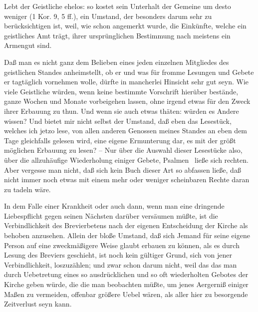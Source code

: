 \begin{aufza}
\begin{aufzb}
\item Lebt der Geistliche ehelos: so kostet sein Unterhalt der Gemeine um desto weniger (1 Kor. 9, 5 ff.), ein Umstand, der besonders darum sehr zu berücksichtigen ist, weil, wie schon angemerkt wurde, die Einkünfte, welche ein geistliches Amt trägt, ihrer ursprünglichen Bestimmung nach meistens ein Armengut sind.~
\end{aufzb}
\item Daß man es nicht ganz dem Belieben eines jeden einzelnen Mitgliedes des geistlichen Standes anheimstellt, ob er und was für fromme Lesungen und Gebete er tagtäglich vornehmen wolle, dürfte in mancherlei Hinsicht sehr gut seyn. Wie viele Geistliche würden, wenn keine bestimmte Vorschrift hierüber bestände, ganze Wochen und Monate vorbeigehen lassen, ohne irgend etwas für den Zweck ihrer Erbauung zu thun. Und wenn sie auch etwas thäten: würden es Andere wissen? Und bietet mir nicht selbst der Umstand, daß eben das Lesestück, welches ich jetzo lese, von allen anderen Genossen meines Standes an eben dem Tage gleichfalls gelesen wird, eine eigene Ermunterung dar, es mit der größt möglichen Erbauung zu lesen? -- Nur über die Auswahl dieser Lesestücke also, über die allzuhäufige Wiederholung einiger Gebete, Psalmen \udgl\  ließe sich rechten. Aber vergesse man nicht, daß sich kein Buch dieser Art so abfassen ließe, daß nicht immer noch etwas mit einem mehr oder weniger scheinbaren Rechte daran zu tadeln wäre.
\end{aufza}
\begin{RWanm} 
In dem Falle einer Krankheit oder auch dann, wenn man eine dringende Liebespflicht gegen seinen Nächsten darüber versäumen müßte, ist die Verbindlichkeit des Brevierbetens nach der eigenen Entscheidung der Kirche als behoben anzusehen. Allein der bloße Umstand, daß sich Jemand für seine eigene Person auf eine zweckmäßigere Weise glaubt erbauen zu können, als es durch Lesung des Breviers geschieht, ist noch kein gültiger Grund, sich von jener Verbindlichkeit, loszuzählen; und zwar schon darum nicht, weil das  das man durch Uebetretung eines so ausdrücklichen und so oft wiederholten Gebotes der Kirche geben würde, die  die man beobachten müßte, um jenes Aergerniß einiger Maßen zu vermeiden, offenbar größere Uebel wären, als aller hier zu besorgende Zeitverlust seyn kann. 
\end{RWanm}

